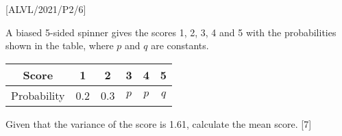 \item {[}ALVL/2021/P2/6{]}

A biased 5-sided spinner gives the scores 1, 2, 3, 4 and 5 with the
probabilities shown in the table, where $p$ and $q$ are constants. 
\begin{center}
\begin{tabular}{|c|c|c|c|c|c|}
\hline 
Score & 1 & 2 & 3 & 4 & 5\tabularnewline
\hline 
Probability & 0.2 & 0.3 & $p$ & $p$ & $q$\tabularnewline
\hline 
\end{tabular}
\par\end{center}

Given that the variance of the score is 1.61, calculate the mean score.
\hfill{} {[}7{]}
